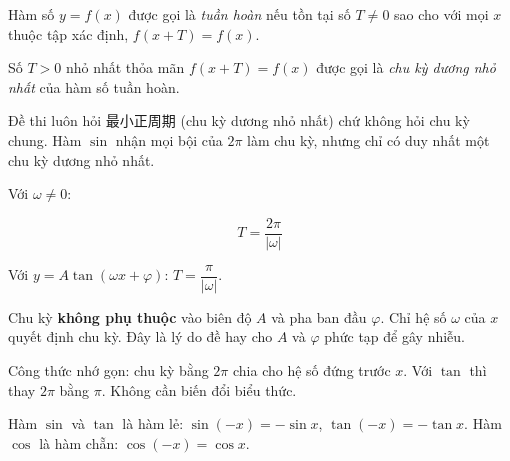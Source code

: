 \documentclass[11pt, a4paper]{article}
\begin{document}
\begin{dinhnghia}
Hàm số $y = f(x)$ được gọi là \emph{tuần hoàn} nếu tồn tại số $T \neq 0$ sao cho với mọi $x$ thuộc tập xác định, $f(x + T) = f(x)$.
\end{dinhnghia}
\begin{dinhnghia}
Số $T > 0$ nhỏ nhất thỏa mãn $f(x + T) = f(x)$ được gọi là \emph{chu kỳ dương nhỏ nhất} của hàm số tuần hoàn.

 Đề thi luôn hỏi 最小正周期 (chu kỳ dương nhỏ nhất) chứ không hỏi chu kỳ chung. Hàm $\sin$ nhận mọi bội của $2\pi$ làm chu kỳ, nhưng chỉ có duy nhất một chu kỳ dương nhỏ nhất.
\end{dinhnghia}
\begin{dinhly}
\end{dinhly}
\begin{dinhly}[{2 — Chu kỳ của hàm số dạng $y = A\sin(\omega x + \varphi)$}]
Với $\omega \neq 0$:

$$T = \frac{2\pi}{|\omega|}$$

Với $y = A\tan(\omega x + \varphi)$: $T = \dfrac{\pi}{|\omega|}$.

 Chu kỳ \textbf{không phụ thuộc} vào biên độ $A$ và pha ban đầu $\varphi$. Chỉ hệ số $\omega$ của $x$ quyết định chu kỳ. Đây là lý do đề hay cho $A$ và $\varphi$ phức tạp để gây nhiễu.

 Công thức nhớ gọn: chu kỳ bằng $2\pi$ chia cho hệ số đứng trước $x$. Với $\tan$ thì thay $2\pi$ bằng $\pi$. Không cần biến đổi biểu thức.
\end{dinhly}
\begin{dinhly}
Hàm $\sin$ và $\tan$ là hàm lẻ: $\sin(-x) = -\sin x$, $\tan(-x) = -\tan x$. Hàm $\cos$ là hàm chẵn: $\cos(-x) = \cos x$.
\end{dinhly}
\end{document}
